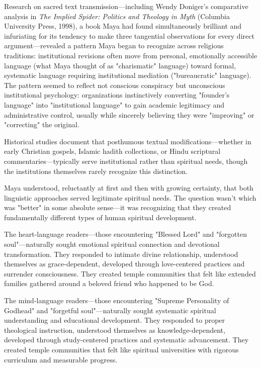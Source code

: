 \documentclass[12pt,twoside]{book}
\begin{document}
Research on sacred text transmission—including Wendy Doniger's comparative analysis in \emph{The Implied Spider: Politics and Theology in Myth} (Columbia University Press, 1998), a book Maya had found simultaneously brilliant and infuriating for its tendency to make three tangential observations for every direct argument—revealed a pattern Maya began to recognize across religious traditions: institutional revisions often move from personal, emotionally accessible language (what Maya thought of as "charismatic" language) toward formal, systematic language requiring institutional mediation ("bureaucratic" language). The pattern seemed to reflect not conscious conspiracy but unconscious institutional psychology: organizations instinctively converting "founder's language" into "institutional language" to gain academic legitimacy and administrative control, usually while sincerely believing they were "improving" or "correcting" the original.

Historical studies document that posthumous textual modifications—whether in early Christian gospels, Islamic hadith collections, or Hindu scriptural commentaries—typically serve institutional rather than spiritual needs, though the institutions themselves rarely recognize this distinction.

Maya understood, reluctantly at first and then with growing certainty, that both linguistic approaches served legitimate spiritual needs. The question wasn't which was "better" in some absolute sense—it was recognizing that they created fundamentally different types of human spiritual development.

The heart-language readers—those encountering "Blessed Lord" and "forgotten soul"—naturally sought emotional spiritual connection and devotional transformation. They responded to intimate divine relationship, understood themselves as grace-dependent, developed through love-centered practices and surrender consciousness. They created temple communities that felt like extended families gathered around a beloved friend who happened to be God.

The mind-language readers—those encountering "Supreme Personality of Godhead" and "forgetful soul"—naturally sought systematic spiritual understanding and educational development. They responded to proper theological instruction, understood themselves as knowledge-dependent, developed through study-centered practices and systematic advancement. They created temple communities that felt like spiritual universities with rigorous curriculum and measurable progress.
\end{document}
